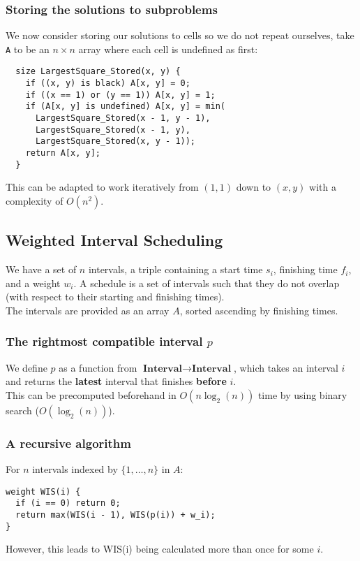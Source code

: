 \documentclass[a4paper, 12pt, twoside]{article}
\begin{document}
\subsubsection{Storing the solutions to subproblems}

We now consider storing our solutions to cells so we do not repeat
ourselves, take \texttt{A} to be an $n \times n$ array
where each cell is undefined as first: \begin{lstlisting}
  size LargestSquare_Stored(x, y) {
    if ((x, y) is black) A[x, y] = 0;
    if ((x == 1) or (y == 1)) A[x, y] = 1;
    if (A[x, y] is undefined) A[x, y] = min(
      LargestSquare_Stored(x - 1, y - 1),
      LargestSquare_Stored(x - 1, y),
      LargestSquare_Stored(x, y - 1));
    return A[x, y];
  }
\end{lstlisting} This can be adapted to work iteratively from
$(1, 1)$ down to $(x, y)$ with a complexity of $O(n^2)$.

\newpage

\subsection{Weighted Interval Scheduling}

We have a set of $n$ intervals, a triple containing a
start time $s_i$, finishing time $f_i$, and a weight $w_i$.
A schedule is a set of intervals such that they do not overlap
(with respect to their starting and finishing times).
\\[\baselineskip]
The intervals are provided as an array $A$, sorted ascending by
finishing times.

\subsubsection{The rightmost compatible interval $p$}

We define $p$ as a function from $\textbf{Interval} \to \textbf{Interval}$,
which takes an interval $i$ and returns the \textbf{latest} interval that 
finishes \textbf{before} $i$.
\\[\baselineskip]
This can be precomputed beforehand in $O(n\log_2(n))$ time by using 
binary search ($O(\log_2(n))$).

\subsubsection{A recursive algorithm}

For $n$ intervals indexed by $\{1, \ldots, n\}$ in $A$: \begin{lstlisting}
weight WIS(i) {
  if (i == 0) return 0;
  return max(WIS(i - 1), WIS(p(i)) + w_i);
}
\end{lstlisting} However, this leads to WIS(i) being calculated more than once
for some $i$.
\end{document}
